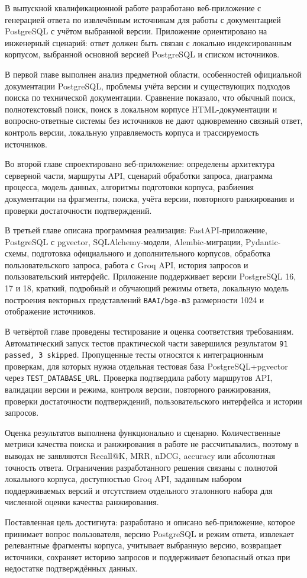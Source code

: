 \Conclusion

В выпускной квалификационной работе разработано веб-приложение с генерацией ответа по извлечённым источникам для работы с документацией PostgreSQL с учётом выбранной версии. Приложение ориентировано на инженерный сценарий: ответ должен быть связан с локально индексированным корпусом, выбранной основной версией PostgreSQL и списком источников.

В первой главе выполнен анализ предметной области, особенностей официальной документации PostgreSQL, проблемы учёта версии и существующих подходов поиска по технической документации. Сравнение показало, что обычный поиск, полнотекстовый поиск, поиск в локальном корпусе HTML-документации и вопросно-ответные системы без источников не дают одновременно связный ответ, контроль версии, локальную управляемость корпуса и трассируемость источников.

Во второй главе спроектировано веб-приложение: определены архитектура серверной части, маршруты API, сценарий обработки запроса, диаграмма процесса, модель данных, алгоритмы подготовки корпуса, разбиения документации на фрагменты, поиска, учёта версии, повторного ранжирования и проверки достаточности подтверждений.

В третьей главе описана программная реализация: FastAPI-приложение, PostgreSQL с pgvector, SQLAlchemy-модели, Alembic-миграции, Pydantic-схемы, подготовка официального и дополнительного корпусов, обработка пользовательского запроса, работа с Groq API, история запросов и пользовательский интерфейс. Приложение поддерживает версии PostgreSQL 16, 17 и 18, краткий, подробный и обучающий режимы ответа, локальную модель построения векторных представлений \texttt{BAAI/bge-m3} размерности 1024 и отображение источников.

В четвёртой главе проведены тестирование и оценка соответствия требованиям. Автоматический запуск тестов практической части завершился результатом \texttt{91 passed, 3 skipped}. Пропущенные тесты относятся к интеграционным проверкам, для которых нужна отдельная тестовая база PostgreSQL+pgvector через \texttt{TEST\_DATABASE\_URL}. Проверка подтвердила работу маршрутов API, валидации версии и режима, контроля версии, повторного ранжирования, проверки достаточности подтверждений, пользовательского интерфейса и истории запросов.

Оценка результатов выполнена функционально и сценарно. Количественные метрики качества поиска и ранжирования в работе не рассчитывались, поэтому в выводах не заявляются Recall@K, MRR, nDCG, accuracy или абсолютная точность ответа. Ограничения разработанного решения связаны с полнотой локального корпуса, доступностью Groq API, заданным набором поддерживаемых версий и отсутствием отдельного эталонного набора для численной оценки качества ранжирования.

Поставленная цель достигнута: разработано и описано веб-приложение, которое принимает вопрос пользователя, версию PostgreSQL и режим ответа, извлекает релевантные фрагменты корпуса, учитывает выбранную версию, возвращает источники, сохраняет историю запросов и поддерживает безопасный отказ при недостатке подтверждённых данных.
